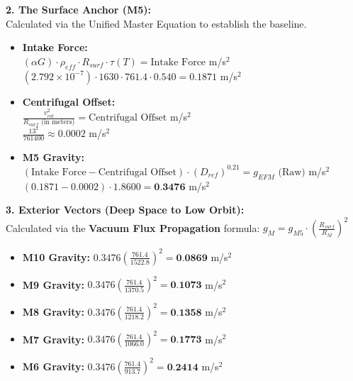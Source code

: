 \documentclass[11pt, a4paper]{article}
\begin{document}
  \vspace{1.0em}
  \noindent \textbf{2. The Surface Anchor (M5):} \\
  \hspace*{1em} Calculated via the Unified Master Equation to establish the baseline.
  \begin{itemize}
    \item \textbf{Intake Force:} \\[0.5em]
    \hspace*{2em} $(\alpha G) \cdot \rho_{eff} \cdot R_{surf} \cdot \tau(T) = \text{Intake Force}$ m/s$^2$ \\[1em]
    \hspace*{2em} $(2.792 \times 10^{-7}) \cdot 1630 \cdot 761.4 \cdot 0.540 = 0.1871$ m/s$^2$
    
    \item \textbf{Centrifugal Offset:} \\[0.5em]
    \hspace*{2em} $\frac{v_{rot}^2}{R_{surf} \text{ (in meters)}} = \text{Centrifugal Offset}$ m/s$^2$ \\[1em]
    \hspace*{2em} $\frac{13^2}{761400} \approx 0.0002$ m/s$^2$
    
    \item \textbf{M5 Gravity:} \\[0.5em]
    \hspace*{2em} $(\text{Intake Force} - \text{Centrifugal Offset}) \cdot (D_{ref})^{0.21} = g_{EFM} \text{ (Raw)}$ m/s$^2$ \\[1em]
    \hspace*{2em} $(0.1871 - 0.0002) \cdot 1.8600 = \textbf{0.3476}$ m/s$^2$
  \end{itemize}

  \clearpage
  \noindent \textbf{3. Exterior Vectors (Deep Space to Low Orbit):} \\
  \hspace*{1em} Calculated via the \textbf{Vacuum Flux Propagation} formula: $g_M = g_{M5} \cdot \left( \frac{R_{surf}}{R_M} \right)^2$
  \begin{itemize}
    \item \textbf{M10 Gravity:} $0.3476 \left( \frac{761.4}{1522.8} \right)^2 = \textbf{0.0869}$ m/s$^2$
    \item \textbf{M9 Gravity:} $0.3476 \left( \frac{761.4}{1370.5} \right)^2 = \textbf{0.1073}$ m/s$^2$
    \item \textbf{M8 Gravity:} $0.3476 \left( \frac{761.4}{1218.2} \right)^2 = \textbf{0.1358}$ m/s$^2$
    \item \textbf{M7 Gravity:} $0.3476 \left( \frac{761.4}{1066.0} \right)^2 = \textbf{0.1773}$ m/s$^2$
    \item \textbf{M6 Gravity:} $0.3476 \left( \frac{761.4}{913.7} \right)^2 = \textbf{0.2414}$ m/s$^2$
  \end{itemize}
\end{document}
